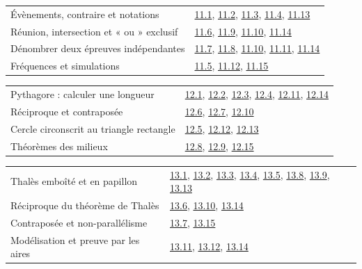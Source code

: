 \begin{tabularx}{\linewidth}{@{}Yl@{}}\toprule
Évènements, contraire et notations & \hyperref[exo-11-1]{11.1}, \hyperref[exo-11-2]{11.2}, \hyperref[exo-11-3]{11.3}, \hyperref[exo-11-4]{11.4}, \hyperref[exo-11-13]{11.13}\\[2mm]
Réunion, intersection et « ou » exclusif & \hyperref[exo-11-6]{11.6}, \hyperref[exo-11-9]{11.9}, \hyperref[exo-11-10]{11.10}, \hyperref[exo-11-14]{11.14}\\[2mm]
Dénombrer deux épreuves indépendantes & \hyperref[exo-11-7]{11.7}, \hyperref[exo-11-8]{11.8}, \hyperref[exo-11-10]{11.10}, \hyperref[exo-11-11]{11.11}, \hyperref[exo-11-14]{11.14}\\[2mm]
Fréquences et simulations & \hyperref[exo-11-5]{11.5}, \hyperref[exo-11-12]{11.12}, \hyperref[exo-11-15]{11.15}\\[2mm]
\bottomrule\end{tabularx}\par\vspace{4mm}
\begin{tabularx}{\linewidth}{@{}Yl@{}}\toprule
Pythagore : calculer une longueur & \hyperref[exo-12-1]{12.1}, \hyperref[exo-12-2]{12.2}, \hyperref[exo-12-3]{12.3}, \hyperref[exo-12-4]{12.4}, \hyperref[exo-12-11]{12.11}, \hyperref[exo-12-14]{12.14}\\[2mm]
Réciproque et contraposée & \hyperref[exo-12-6]{12.6}, \hyperref[exo-12-7]{12.7}, \hyperref[exo-12-10]{12.10}\\[2mm]
Cercle circonscrit au triangle rectangle & \hyperref[exo-12-5]{12.5}, \hyperref[exo-12-12]{12.12}, \hyperref[exo-12-13]{12.13}\\[2mm]
Théorèmes des milieux & \hyperref[exo-12-8]{12.8}, \hyperref[exo-12-9]{12.9}, \hyperref[exo-12-15]{12.15}\\[2mm]
\bottomrule\end{tabularx}\par\vspace{4mm}
\clearpage
{}\fontsize{10}{13}\selectfont
{}\begin{tabularx}{\linewidth}{@{}Yl@{}}\toprule
Thalès emboîté et en papillon & \hyperref[exo-13-1]{13.1}, \hyperref[exo-13-2]{13.2}, \hyperref[exo-13-3]{13.3}, \hyperref[exo-13-4]{13.4}, \hyperref[exo-13-5]{13.5}, \hyperref[exo-13-8]{13.8}, \hyperref[exo-13-9]{13.9}, \hyperref[exo-13-13]{13.13}\\[2mm]
Réciproque du théorème de Thalès & \hyperref[exo-13-6]{13.6}, \hyperref[exo-13-10]{13.10}, \hyperref[exo-13-14]{13.14}\\[2mm]
Contraposée et non-parallélisme & \hyperref[exo-13-7]{13.7}, \hyperref[exo-13-15]{13.15}\\[2mm]
Modélisation et preuve par les aires & \hyperref[exo-13-11]{13.11}, \hyperref[exo-13-12]{13.12}, \hyperref[exo-13-14]{13.14}\\[2mm]
\bottomrule\end{tabularx}\par\vspace{4mm}
